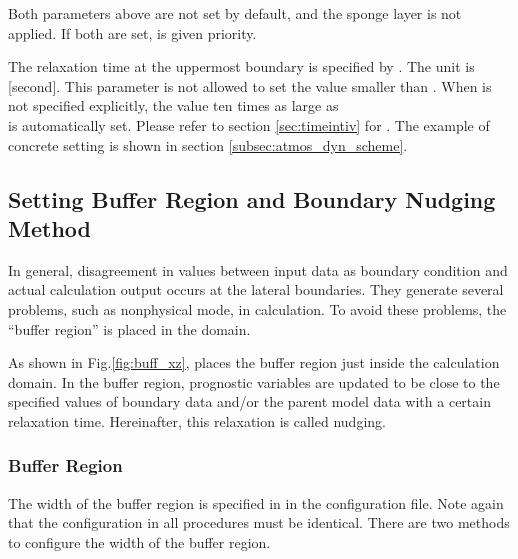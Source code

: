 Both parameters above are not set by default, and the sponge layer is not applied. If both are set,  is given priority.

The relaxation time at the uppermost boundary is specified by . The unit is [second]. This parameter is not allowed to set the value smaller than . When  is not specified explicitly, the value ten times as large as \\
 is automatically set. Please refer to section \ref{sec:timeintiv} for .
The example of concrete setting is shown in section \ref{subsec:atmos_dyn_scheme}.

\subsection{Setting Buffer Region and Boundary Nudging Method} \label{subsec:buffer}

In general, disagreement in values between input data as boundary condition and actual calculation output occurs at the lateral boundaries.
They generate several problems, such as nonphysical mode, in calculation.
To avoid these problems, the ``buffer region'' is placed in the domain.

As shown in Fig.\ref{fig:buff_xz}, \scalerm places the buffer region just inside the calculation domain.
In the buffer region, prognostic variables are updated to be close to the specified values of boundary data and/or the parent model data with a certain relaxation time.
Hereinafter, this relaxation is called nudging.

\subsubsection{Buffer Region}


The width of the buffer region is specified in  in the configuration file. Note again that the configuration in all procedures must be identical. There are two methods to configure the width of the buffer region.

